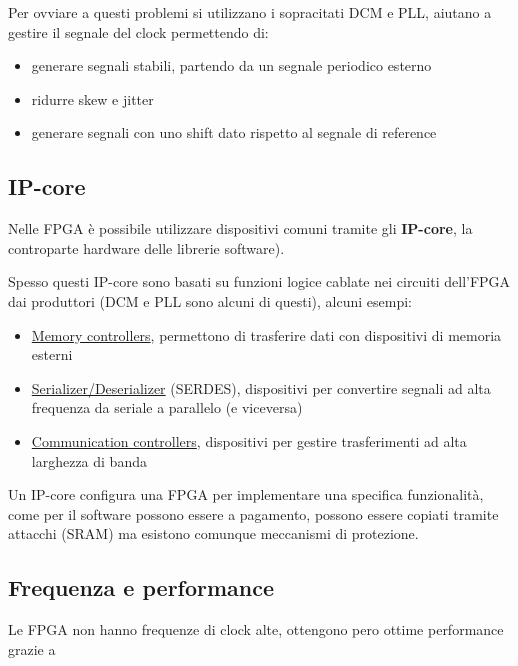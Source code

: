 Per ovviare a questi problemi si utilizzano i sopracitati DCM e PLL, aiutano a gestire il segnale del clock permettendo di:
\begin{itemize}
    \item generare segnali stabili, partendo da un segnale periodico esterno
    \item ridurre skew e jitter
    \item generare segnali con uno shift dato rispetto al segnale di reference
\end{itemize}

\subsection{IP-core}
Nelle FPGA è possibile utilizzare dispositivi comuni tramite gli \textbf{IP-core}, la controparte hardware delle librerie software).

Spesso questi IP-core sono basati su funzioni logice cablate nei circuiti dell'FPGA dai produttori (DCM e PLL sono alcuni di questi), alcuni esempi:
\begin{itemize}
    \item \underline{Memory controllers}, permettono di trasferire dati con dispositivi di memoria esterni
    \item \underline{Serializer/Deserializer} (SERDES), dispositivi per convertire segnali ad alta frequenza da seriale a parallelo (e viceversa)
    \item \underline{Communication controllers}, dispositivi per gestire trasferimenti ad alta larghezza di banda
\end{itemize}

Un IP-core configura una FPGA per implementare una specifica funzionalità, come per il software possono essere a pagamento, possono essere copiati tramite attacchi (SRAM) ma esistono comunque meccanismi di protezione.

\subsection{Frequenza e performance}
Le FPGA non hanno frequenze di clock alte, ottengono pero ottime performance grazie a 












































